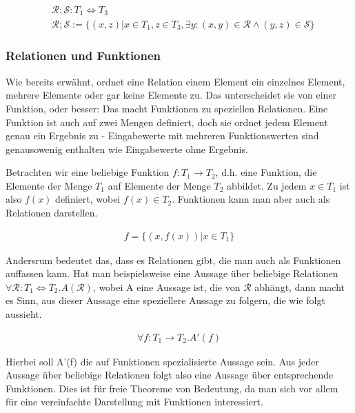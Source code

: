 \begin{align*}
&\mathcal{R} ; \mathcal{S} : T_1 \Leftrightarrow T_3\\
&\mathcal{R} ; \mathcal{S} := \{ (x, z) | x \in T_1, z \in T_3, \exists y : (x, y) \in \mathcal{R} \wedge (y, z) \in \mathcal{S} \}
\end{align*}


\subsubsection{Relationen und Funktionen}

Wie bereits erwähnt, ordnet eine Relation einem Element ein einzelnes Element, mehrere Elemente oder gar keine Elemente zu.
Das unterscheidet sie von einer Funktion, oder besser: Das macht Funktionen zu speziellen Relationen. Eine
Funktion ist auch auf zwei Mengen definiert, doch sie ordnet jedem Element genau ein Ergebnis zu - Eingabewerte mit
mehreren Funktionswerten sind genausowenig enthalten wie Eingabewerte ohne Ergebnis.

Betrachten wir eine beliebige Funktion $f : T_1 \rightarrow T_2$, d.h. eine Funktion, die Elemente der Menge $T_1$ auf
Elemente der Menge $T_2$ abbildet. Zu jedem $x \in T_1$ ist also $f(x)$ definiert, wobei $f(x) \in T_2$. Funktionen kann
man aber auch als Relationen darstellen.

\begin{align*}
f = \{ (x, f(x)) | x \in T_1 \}
\end{align*}

Andersrum bedeutet das, dass es Relationen gibt, die man auch als Funktionen auffassen kann. Hat man beispielsweise
eine Aussage über beliebige Relationen $\forall \mathcal{R} : T_1 \Leftrightarrow T_2 . A(\mathcal{R})$, wobei A eine
Aussage ist, die von $\mathcal{R}$ abhängt, dann macht es Sinn, aus dieser Aussage eine speziellere Aussage zu folgern,
die wie folgt aussieht.

\begin{align*}
\forall f : T_1 \rightarrow T_2 . A'(f)
\end{align*}

Hierbei soll A'(f) die auf Funktionen spezialisierte Aussage sein. Aus jeder Aussage über beliebige Relationen folgt also eine
Aussage über entsprechende Funktionen. Dies ist für freie Theoreme von Bedeutung, da man sich vor allem für eine vereinfachte
Darstellung mit Funktionen interessiert.


